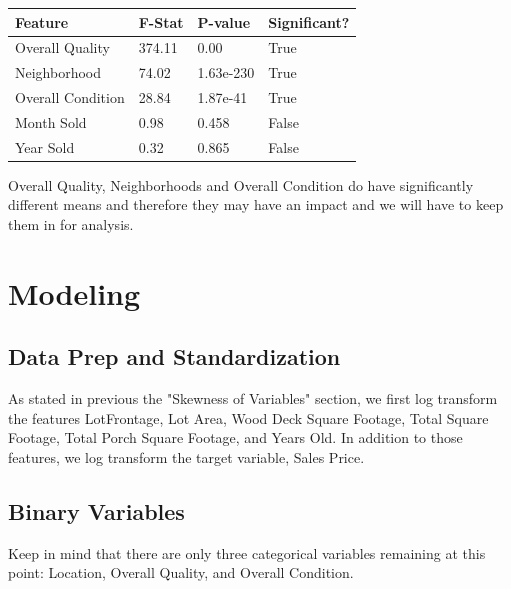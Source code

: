 \documentclass{article}
\begin{document}
	\begin{table}[H]
		\centering
		\begin{tabular}{llll}
		\hline
		\multicolumn{1}{|l|}{Feature} & \multicolumn{1}{l|}{F-Stat} & \multicolumn{1}{l|}{P-value} & \multicolumn{1}{l|}{Significant?} \\ \hline
		Overall Quality               & 374.11                      & 0.00                         & True                              \\
		Neighborhood                  & 74.02                       & 1.63e-230                    & True                              \\
		Overall Condition             & 28.84                       & 1.87e-41                     & True                              \\
		Month Sold                    & 0.98                        & 0.458                        & False                             \\
		Year Sold                     & 0.32                        & 0.865                        & False                            
		\end{tabular}
		\end{table}
	

	Overall Quality, Neighborhoods and Overall Condition do have significantly different means and therefore they may have an impact and we will have to keep them in for analysis.

	\section{Modeling}

	\subsection{Data Prep and Standardization}
	
	As stated in previous the "Skewness of Variables" section, we first log transform the features LotFrontage, Lot Area, Wood Deck Square Footage, Total Square Footage, Total Porch Square Footage, and Years Old. In addition to those features, we log transform the target variable, Sales Price.

	\subsection{Binary Variables}

	Keep in mind that there are only three categorical variables remaining at this point: Location, Overall Quality, and Overall Condition.
\end{document}
